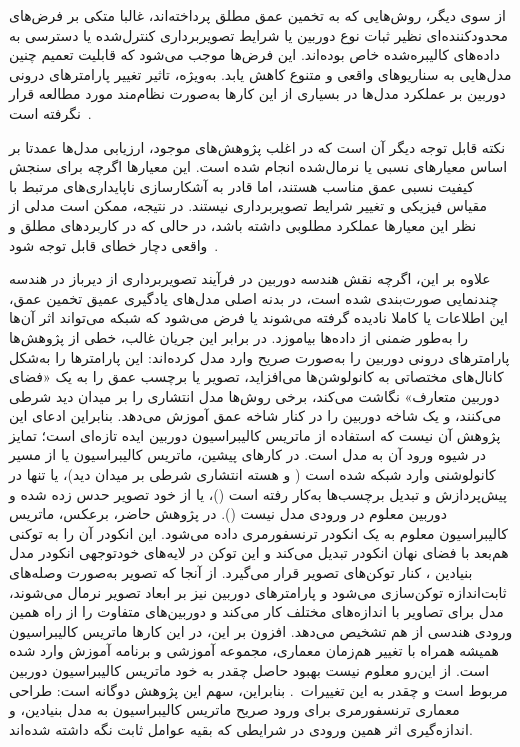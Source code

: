 از سوی دیگر، روش‌هایی که به تخمین عمق مطلق پرداخته‌اند،
غالبا متکی بر فرض‌های محدودکننده‌ای نظیر ثبات نوع دوربین یا شرایط تصویربرداری کنترل‌شده یا دسترسی به داده‌های کالیبره‌شده خاص بوده‌اند. این فرض‌ها موجب می‌شود که قابلیت تعمیم چنین مدل‌هایی به سناریوهای واقعی و متنوع کاهش یابد. به‌ویژه، تاثیر تغییر پارامترهای درونی دوربین بر عملکرد مدل‌ها در بسیاری از این کارها به‌صورت نظام‌مند مورد مطالعه قرار نگرفته است~\cite{Ranftl2021DPT,Bhat2023ZoeDepth}.

نکته قابل توجه دیگر آن است که در اغلب پژوهش‌های موجود،
ارزیابی مدل‌ها عمدتا بر اساس معیارهای نسبی یا نرمال‌شده انجام شده است. این معیارها اگرچه برای سنجش کیفیت نسبی عمق مناسب هستند، اما قادر به آشکارسازی ناپایداری‌های مرتبط با مقیاس فیزیکی و تغییر شرایط تصویربرداری نیستند. در نتیجه، ممکن است مدلی از نظر این معیارها عملکرد مطلوبی داشته باشد، در حالی که در کاربردهای مطلق و واقعی دچار خطای قابل توجه شود~\cite{Eigen2015Predicting}.

علاوه بر این، اگرچه نقش هندسه دوربین در فرآیند تصویربرداری از دیرباز در هندسه
چندنمایی صورت‌بندی شده است، در بدنه اصلی مدل‌های
یادگیری عمیق تخمین عمق، این اطلاعات یا کاملا نادیده گرفته می‌شوند یا فرض می‌شود
که شبکه می‌تواند اثر آن‌ها را به‌طور ضمنی از داده‌ها بیاموزد.
در برابر این جریان غالب، خطی از پژوهش‌ها پارامترهای درونی دوربین را به‌صورت صریح
وارد مدل کرده‌اند:  این پارامترها را به‌شکل کانال‌های مختصاتی به
کانولوشن‌ها می‌افزاید،  تصویر یا برچسب عمق
را به یک «فضای دوربین متعارف» نگاشت می‌کند، برخی روش‌ها مدل
انتشاری را بر میدان دید شرطی می‌کنند، و  یک
شاخه دوربین را در کنار شاخه عمق آموزش می‌دهد.
بنابراین ادعای این پژوهش آن نیست که استفاده از ماتریس کالیبراسیون دوربین ایده تازه‌ای است؛ تمایز در شیوه ورود آن به مدل است.
در کارهای پیشین، ماتریس کالیبراسیون یا از مسیر کانولوشنی وارد شبکه شده است
( و هسته انتشاری شرطی بر میدان دید)، یا تنها در پیش‌پردازش و تبدیل برچسب‌ها به‌کار رفته
است ()، یا از خود تصویر حدس زده شده و دوربین معلوم در ورودی مدل نیست
(). در پژوهش حاضر، برعکس، ماتریس کالیبراسیون معلوم به یک انکودر ترنسفورمری
داده می‌شود. این انکودر آن را به توکنی هم‌بعد با فضای نهان انکودر تبدیل می‌کند و این توکن
در لایه‌های خودتوجهی انکودر  مدل بنیادین ، کنار توکن‌های تصویر قرار می‌گیرد.
از آنجا که تصویر به‌صورت وصله‌های ثابت‌اندازه توکن‌سازی می‌شود و پارامترهای دوربین نیز بر ابعاد تصویر نرمال می‌شوند،
مدل برای تصاویر با اندازه‌های مختلف کار می‌کند و دوربین‌های متفاوت را از راه همین ورودی هندسی از هم تشخیص می‌دهد.
افزون بر این، در این کارها ماتریس کالیبراسیون همیشه همراه با تغییر هم‌زمان معماری، مجموعه آموزشی و
برنامه آموزش وارد شده است. از این‌رو معلوم نیست بهبود حاصل چقدر به خود ماتریس کالیبراسیون دوربین
مربوط است و چقدر به این تغییرات~\cite{HartleyZisserman2004,Eigen2014Depth,Godard2019Digging,Ranftl2021DPT,Facil2019CAMConvs,Yin2023Metric3D,Saxena2023FOV,Piccinelli2024UniDepth}.
بنابراین، سهم این پژوهش دوگانه است: طراحی معماری ترنسفورمری برای ورود صریح ماتریس کالیبراسیون به مدل بنیادین،
و اندازه‌گیری اثر همین ورودی در شرایطی که بقیه عوامل ثابت نگه داشته شده‌اند.

